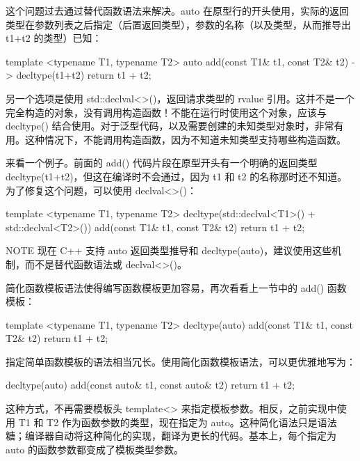 这个问题过去通过替代函数语法来解决。auto 在原型行的开头使用，实际的返回类型在参数列表之后指定（后置返回类型），参数的名称（以及类型，从而推导出 t1+t2 的类型）已知：

\begin{cpp}
template <typename T1, typename T2>
auto add(const T1& t1, const T2& t2) -> decltype(t1+t2)
{
    return t1 + t2;
}
\end{cpp}

另一个选项是使用 std::declval<>()，返回请求类型的 rvalue 引用。这并不是一个完全构造的对象，没有调用构造函数！不能在运行时使用这个对象，应该与 decltype() 结合使用。对于泛型代码，以及需要创建的未知类型对象时，非常有用。这种情况下，不能调用构造函数，因为不知道未知类型支持哪些构造函数。

来看一个例子。前面的 add() 代码片段在原型开头有一个明确的返回类型 decltype(t1+t2)，但这在编译时不会通过，因为 t1 和 t2 的名称那时还不知道。为了修复这个问题，可以使用 declval<>()：

\begin{cpp}
template <typename T1, typename T2>
decltype(std::declval<T1>() + std::declval<T2>()) add(const T1& t1, const T2& t2)
{
    return t1 + t2;
}
\end{cpp}

\begin{myNotic}{NOTE}
现在 C++ 支持 auto 返回类型推导和 decltype(auto)，建议使用这些机制，而不是替代函数语法或 declval<>()。
\end{myNotic}


简化函数模板语法使得编写函数模板更加容易，再次看看上一节中的 add() 函数模板：

\begin{cpp}
template <typename T1, typename T2>
decltype(auto) add(const T1& t1, const T2& t2) { return t1 + t2; }
\end{cpp}

指定简单函数模板的语法相当冗长。使用简化函数模板语法，可以更优雅地写为：

\begin{cpp}
decltype(auto) add(const auto& t1, const auto& t2) { return t1 + t2; }
\end{cpp}

这种方式，不再需要模板头 template<> 来指定模板参数。相反，之前实现中使用 T1 和 T2 作为函数参数的类型，现在指定为 auto。这种简化语法只是语法糖；编译器自动将这种简化的实现，翻译为更长的代码。基本上，每个指定为 auto 的函数参数都变成了模板类型参数。

